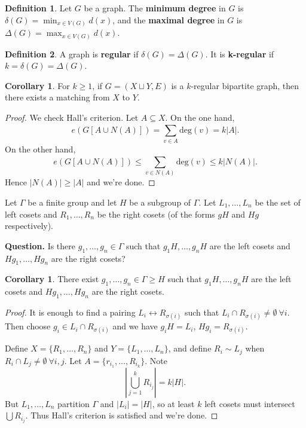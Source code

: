 \documentclass{article}
\theoremstyle{definition}
\newtheorem{cor}[theorem]{Corollary}
\newtheorem{defn}{Definition}[section]
\begin{document}
\begin{defn}
    Let $G$ be a graph. The \textbf{minimum degree} in $G$ is $\delta(G) = \min_{x \in V(G)} d(x)$, and the \textbf{maximal degree} in $G$ is $\Delta(G) = \max_{x \in V(G)} d(x)$. 
\end{defn}
\begin{defn}
    A graph is \textbf{regular} if $\delta(G)=\Delta(G)$. It is \textbf{k-regular} if $k=\delta(G)=\Delta(G)$.
\end{defn}


\begin{cor}
    For $k\ge 1$, if $G=(X \sqcup Y, E)$ is a $k$-regular bipartite graph, then there exists a matching from $X$ to $Y$.
\end{cor}
\begin{proof}
    We check Hall's criterion. Let $A \subseteq X$. On the one hand, $$e(G[A \cup N(A)]) = \sum_{v \in A}^{} \text{deg}(v) = k|A|.$$ On the other hand, $$e(G[A \cup N(A)]) \le  \sum_{v \in N(A)}^{} \text{deg}(v) \le k|N(A)|.$$
    Hence $|N(A)|\ge |A|$ and we're done.
\end{proof}

Let $\Gamma$ be a finite group and let $H$ be a subgroup of $\Gamma$. Let $L_1,\ldots,L_n$ be the set of left cosets and $R_1,\ldots,R_n$ be the right cosets (of the forms $gH$ and $Hg$ respectively).

\textbf{Question.} Is there $g_1,\ldots,g_n \in \Gamma$ such that $g_1H,\ldots,g_nH$ are the left cosets and $Hg_1,\ldots, Hg_n$ are the right cosets?
\begin{cor}
    There exist $g_1,\ldots,g_n \in \Gamma \ge H$ such that $g_1H,\ldots,g_nH$ are the left cosets and $Hg_1,\ldots,Hg_n$ are the right cosets.
\end{cor}
\begin{proof}
    It is enough to find a pairing $L_i \leftrightarrow R_{\sigma(i)}$ such that $L_i \cap R_{\sigma(i)} \neq \emptyset ~\forall i$. Then choose $g_i \in L_i \cap R_{\sigma(i)}$ and we have $g_i H =L_i$, $Hg_i = R_{\sigma(i)}$.
    \vspace{1mm}
    
    Define $X = \{R_1,\ldots,R_n\}$ and $Y=\{L_1,\ldots, L_n\}$, and define $R_i \sim L_j$ when $R_i \cap L_j \neq \emptyset ~\forall i,j$. Let $A = \{r_{i_1},\ldots,R_{i_k}\}$. Note
    \[
    \left|\bigcup_{j=1}^k R_{i_j}\right| = k|H|.
    \] 
    But $L_1,\ldots,L_n$ partition $\Gamma$ and $|L_i|=|H|$, so at least $k$ left cosets must intersect $\bigcup R_{i_j}$. Thus Hall's criterion is satisfied and we're done.
\end{proof}
\end{document}
